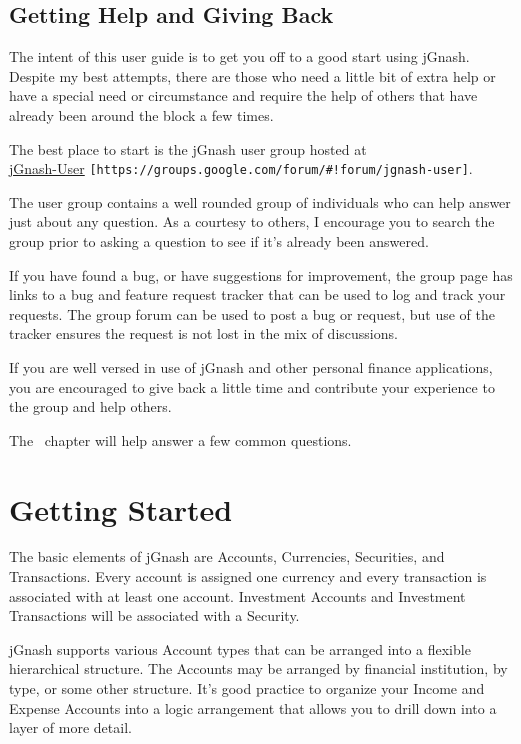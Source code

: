 \documentclass[letterpaper,12pt]{book}
\begin{document}
    \section{Getting Help and Giving Back}\label{sec:getting-help-and-giving-back}
    The intent of this user guide is to get you off to a good start using jGnash.
    Despite my best attempts, there are those who need a little bit of extra help or have a special need or
    circumstance and require the help of others that have already been around the block a few times.

    The best place to start is the jGnash user group hosted at \\
    \href{https://groups.google.com/forum/#!forum/jgnash-user}{jGnash-User} \texttt{[https://groups.google.com/forum/\#!forum/jgnash-user]}.

    The user group contains a well rounded group of individuals who can help answer just about any question.
    As a courtesy to others, I encourage you to search the group prior to asking a question to see if it's already
    been answered.

    If you have found a bug, or have suggestions for improvement, the group page has links to a bug and feature request
    tracker that can be used to log and track your requests.
    The group forum can be used to post a bug or request, but use of the tracker ensures the request is not lost in
    the mix of discussions.

    If you are well versed in use of jGnash and other personal finance applications, you are encouraged to give back a
    little time and contribute your experience to the group and help others.

    The~ chapter will help answer a few common questions.
      
    \chapter{Getting Started}\label{ch:getting-started}
    The basic elements of jGnash are Accounts, Currencies, Securities, and Transactions.
    Every account is assigned one currency and every transaction is associated with at least one account.
    Investment Accounts and Investment Transactions will be associated with a Security.

    jGnash supports various Account types that can be arranged into a flexible hierarchical structure.
    The Accounts may be arranged by financial institution, by type, or some other structure.
    It's good practice to organize your Income and Expense Accounts into a logic arrangement that allows you to drill
    down into a layer of more detail.
\end{document}
